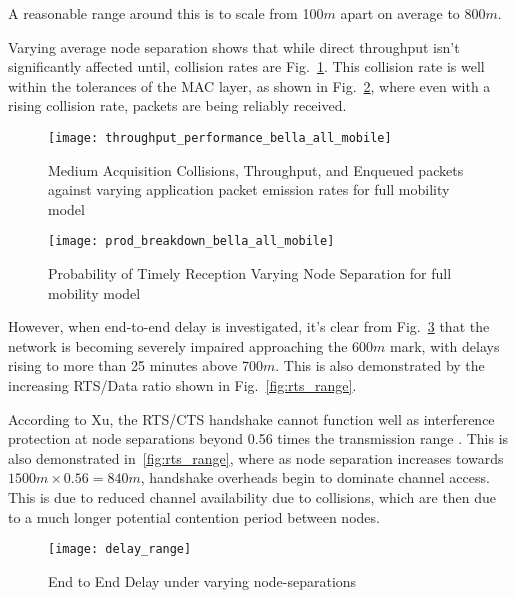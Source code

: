A reasonable range around this is to scale from 100$m$ apart on average to 800$m$.

Varying average node separation shows that while direct throughput isn't significantly affected until, collision rates are Fig.~\ref{fig:throughput_performance_range}.
This collision rate is well within the tolerances of the MAC layer, as shown in Fig.~\ref{fig:prod_breakdown_range}, where even with a rising collision rate, packets are being reliably received.

\begin{figure}[H]
	\centering
	\texttt{[image: throughput\_performance\_bella\_all\_mobile]}
	\caption{Medium Acquisition Collisions, Throughput, and Enqueued packets against varying application packet emission rates for full mobility model}
	\label{fig:throughput_performance_range}
\end{figure}

\begin{figure}[H]
	\centering
	\texttt{[image: prod\_breakdown\_bella\_all\_mobile]}
	\caption{Probability of Timely Reception Varying Node Separation for full mobility model}
	\label{fig:prod_breakdown_range}
\end{figure}

However, when end-to-end delay is investigated, it's clear from Fig.~\ref{fig:delay_range} that the network is becoming severely impaired approaching the 600$m$ mark, with delays rising to more than 25 minutes above 700$m$.
This is also demonstrated by the increasing RTS/Data ratio shown in Fig.~\ref{fig:rts_range}.

According to Xu, the RTS/CTS handshake cannot function well as interference protection at node separations beyond 0.56 times the transmission range \cite{Xu2002}.
This is also demonstrated in~\autoref{fig:rts_range}, where as node separation increases towards $1500m \times 0.56 = 840m$, handshake overheads begin to dominate channel access.
This is due to reduced channel availability due to collisions, which are then due to a much longer potential contention period between nodes. 

\begin{figure}[H]
	\centering
	\texttt{[image: delay\_range]}
	\caption{End to End Delay under varying node-separations}
	\label{fig:delay_range}
\end{figure}


